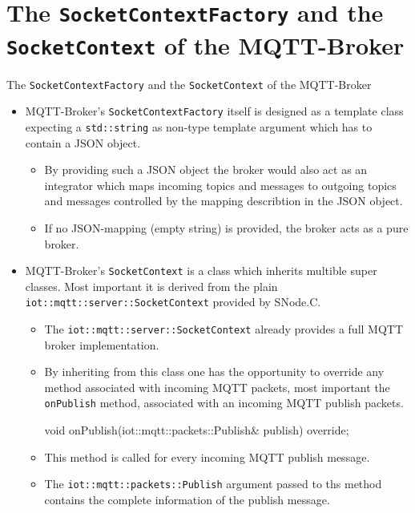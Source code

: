 \section[nosectionpage]{The \texttt{SocketContextFactory} and the \texttt{SocketContext} of the MQTT-Broker}

\begin{frame}[fragile]{The \texttt{SocketContextFactory} and the \texttt{SocketContext} of the MQTT-Broker}
  \begin{itemize}
    \item \alert{MQTT-Broker}'s \alert{\texttt{SocketContextFactory}} itself is designed as a \alert{template class} expecting a \alert{\texttt{std::string}} as \alert{non-type template argument} which has to contain a \alert{JSON} object.
    \begin{itemize}
      \item By \alert{providing} such a \alert{JSON} object the \alert{broker} would \alert{also} act as an \alert{integrator} which \alert{maps incoming topics and messages} to \alert{outgoing topics and messages controlled} by the \alert{mapping describtion in the JSON} object.
      \item If \alert{no JSON}-mapping (empty string) is provided, the broker acts as a \alert{pure broker}.
    \end{itemize}
    \item \alert{MQTT-Broker}'s \alert{\texttt{SocketContext}} is a class which \alert{inherits multible super classes}. Most \alert{important} it is \alert{derived from} the plain \alert{\texttt{iot::mqtt::server::SocketContext}} provided by SNode.C.
    \begin{itemize}
      \item The \alert{\texttt{iot::mqtt::server::SocketContext} already provides a full MQTT broker} implementation.
      \item By \alert{inheriting from this class} one has the \alert{opportunity} to \alert{override any method associated with incoming MQTT packets}, most \alert{important} the \alert{\texttt{onPublish}} method, \alert{associated} with an incoming \alert{MQTT publish packets}.

      \begin{cppcode}[gobble=8]
        void onPublish(iot::mqtt::packets::Publish& publish) override;
      \end{cppcode}
      \item This \alert{method is called for every incoming MQTT publish message}.
      \item The \alert{\texttt{iot::mqtt::packets::Publish}} argument passed to ths method \alert{contains the complete information of the publish message}.
    \end{itemize}
  \end{itemize}
\end{frame}
